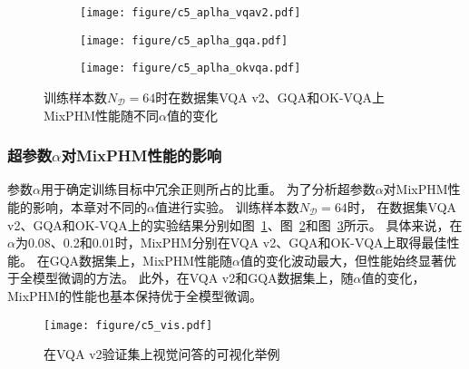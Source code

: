 \begin{figure}[!t]
\begin{subfigure}[b]{0.328\linewidth}
\centering
\texttt{[image: figure/c5\_aplha\_vqav2.pdf]}
\label{fig:c5_abl_hp_alpha_vqav2}
\end{subfigure}
\begin{subfigure}[b]{0.328\linewidth}
\centering
\texttt{[image: figure/c5\_aplha\_gqa.pdf]}
\label{fig:c5_abl_hp_alpha_gqa}
\end{subfigure}
\begin{subfigure}[b]{0.328\linewidth}
\centering
\texttt{[image: figure/c5\_aplha\_okvqa.pdf]}
\label{fig:c5_abl_hp_alpha_okvqa}
\end{subfigure}
\caption{训练样本数$N_{\mathcal{D}}=64$时在数据集VQA v2、GQA和OK-VQA上MixPHM性能随不同$\alpha$值的变化
}
\label{fig:c5_abl_hp_alpha}
\end{figure}


\subsubsection{超参数$\alpha$对MixPHM性能的影响}
参数$\alpha$用于确定训练目标中冗余正则所占的比重。
为了分析超参数$\alpha$对MixPHM性能的影响，本章对不同的$\alpha$值进行实验。
训练样本数$N_{\mathcal{D}}=64$时，
在数据集VQA v2、GQA和OK-VQA上的实验结果分别如图~\ref{fig:c5_abl_hp_alpha_vqav2}、图~\ref{fig:c5_abl_hp_alpha_gqa}和图~\ref{fig:c5_abl_hp_alpha_okvqa}所示。
具体来说，在$\alpha$为0.08、0.2和0.01时，MixPHM分别在VQA v2、GQA和OK-VQA上取得最佳性能。
在GQA数据集上，MixPHM性能随$\alpha$值的变化波动最大，但性能始终显著优于全模型微调的方法。
此外，在VQA v2和GQA数据集上，随$\alpha$值的变化，MixPHM的性能也基本保持优于全模型微调。



\begin{figure*}[!t]
\centering
\texttt{[image: figure/c5\_vis.pdf]}
\caption{在VQA v2验证集上视觉问答的可视化举例}
\label{fig:c5_vis_attn}
\end{figure*}



